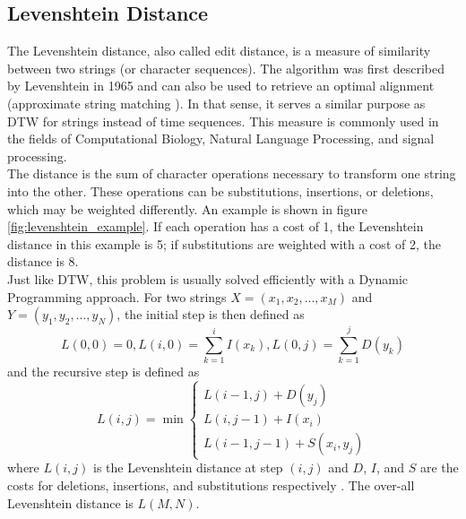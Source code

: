 \subsection{Levenshtein Distance}
The Levenshtein distance, also called edit distance, is a measure of similarity between two strings (or character sequences). The algorithm was first described by Levenshtein in 1965 \cite{levenshtein} and can also be used to retrieve an optimal alignment (approximate string matching \cite{navarro}). In that sense, it serves a similar purpose as DTW for strings instead of time sequences. This measure is commonly used in the fields of Computational Biology, Natural Language Processing, and signal processing.\\

The distance is the sum of character operations necessary to transform one string into the other. These operations can be substitutions, insertions, or deletions, which may be weighted differently. An example is shown in figure \ref{fig:levenshtein_example}. If each operation has a cost of 1, the Levenshtein distance in this example is 5; if substitutions are weighted with a cost of 2, the distance is 8.\\

Just like DTW, this problem is usually solved efficiently with a Dynamic Programming approach. For two strings $X = (x_1,x_2,...,x_M)$ and $Y = (y_1,y_2,...,y_N)$, the initial step is then defined as
\begin{equation}
L(0,0) = 0 , L(i,0) = \sum_{k=1}^{i} I(x_k) , L(0,j) = \sum_{k=1}^{j} D(y_k)
\end{equation}
and the recursive step is defined as
\begin{equation}
L(i,j) = \min \begin{cases}
L(i-1,j) + D(y_j)\\
L(i,j-1) + I(x_i)\\
L(i-1,j-1) + S(x_i,y_j)
\end{cases}       
\end{equation}
where $L(i,j)$ is the Levenshtein distance at step $(i,j)$ and $D$, $I$, and $S$ are the costs for deletions, insertions, and substitutions respectively \cite{applied_computing}. The over-all Levenshtein distance is $L(M,N)$.

